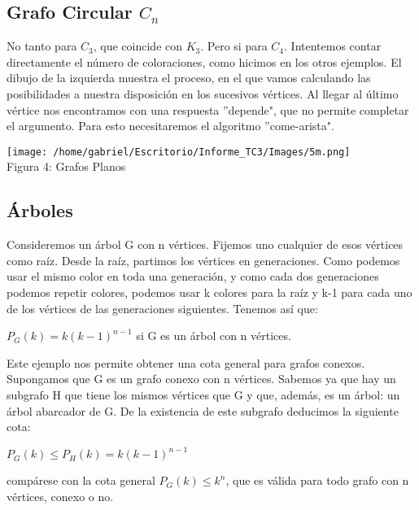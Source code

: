 \documentclass[12pt]{report}
\begin{document}
\subsection{Grafo Circular $C_n$}
No tanto para $C_3$, que coincide con $K_3$. Pero si para $C_4$. Intentemos contar directamente el número de coloraciones, como hicimos en los otros ejemplos. El dibujo de la izquierda muestra el proceso, en el que vamos calculando las posibilidades a nuestra disposición en los sucesivos vértices. Al llegar al último vértice nos encontramos con una respuesta ''depende", que no permite completar el argumento. Para esto necesitaremos el algoritmo ''come-arista".
\begin{center}
\texttt{[image: /home/gabriel/Escritorio/Informe\_TC3/Images/5m.png]}\\
Figura 4: Grafos Planos
\end{center}

\subsection{Árboles}
Consideremos un árbol G con n vértices. Fijemos uno cualquier de esos vértices como raíz. Desde la raíz, partimos los vértices en generaciones. Como podemos usar el mismo color en toda una generación, y como cada dos generaciones podemos repetir colores, podemos usar k colores para la raíz y k-1 para cada uno de los vértices de las generaciones siguientes. Tenemos así que:
\begin{center}
$P_G(k)=k(k-1)^{n-1}$ si G es un árbol con n vértices.
\end{center}
Este ejemplo nos permite obtener una cota general para grafos conexos. Supongamos que G es un grafo conexo con n vértices. Sabemos ya que hay un subgrafo H que tiene los mismos vértices que G y que, además, es un árbol: un árbol abarcador de G. De la existencia de este subgrafo deducimos la siguiente cota:
\begin{center}
$P_G(k) \leq P_H(k)=k(k-1)^{n-1}$
\end{center}
compárese con la cota general $P_G(k) \leq k^n$, que es válida para todo grafo con n vértices, conexo o no.
\end{document}
